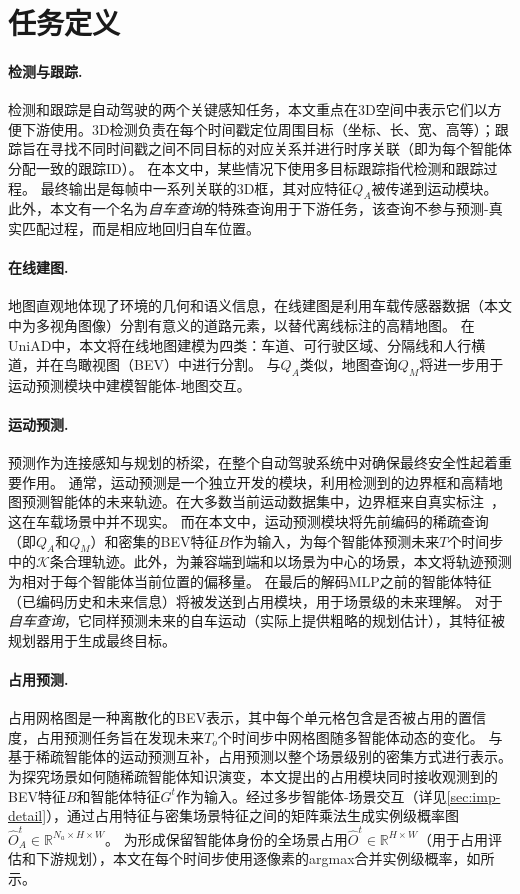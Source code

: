 \documentclass[10pt,twocolumn,letterpaper]{article}
\begin{document}
\section{任务定义}
\label{sec:task-def}

\paragraph{检测与跟踪.}
检测和跟踪是自动驾驶的两个关键感知任务，本文重点在3D空间中表示它们以方便下游使用。3D检测负责在每个时间戳定位周围目标（坐标、长、宽、高等）；跟踪旨在寻找不同时间戳之间不同目标的对应关系并进行时序关联（即为每个智能体分配一致的跟踪ID）。
%
在本文中，某些情况下使用多目标跟踪指代检测和跟踪过程。
%
最终输出是每帧中一系列关联的3D框，其对应特征$Q_A$被传递到运动模块。
%
此外，本文有一个名为\textit{自车查询}的特殊查询用于下游任务，该查询不参与预测-真实匹配过程，而是相应地回归自车位置。

\paragraph{在线建图.} 地图直观地体现了环境的几何和语义信息，在线建图是利用车载传感器数据（本文中为多视角图像）分割有意义的道路元素，以替代离线标注的高精地图。
%
在UniAD中，本文将在线地图建模为四类：车道、可行驶区域、分隔线和人行横道，并在鸟瞰视图（BEV）中进行分割。
%
与$Q_A$类似，地图查询$Q_M$将进一步用于运动预测模块中建模智能体-地图交互。



\paragraph{运动预测.} 预测作为连接感知与规划的桥梁，在整个自动驾驶系统中对确保最终安全性起着重要作用。
%
通常，运动预测是一个独立开发的模块，利用检测到的边界框和高精地图预测智能体的未来轨迹。在大多数当前运动数据集中，边界框来自真实标注~\cite{ettinger2021waymomotion}，这在车载场景中并不现实。
%
而在本文中，运动预测模块将先前编码的稀疏查询（即$Q_{A}$和$Q_{M}$）和密集的BEV特征$B$作为输入，为每个智能体预测未来$T$个时间步中的$\mathcal{K}$条合理轨迹。此外，为兼容端到端和以场景为中心的场景，本文将轨迹预测为相对于每个智能体当前位置的偏移量。
%
在最后的解码MLP之前的智能体特征（已编码历史和未来信息）将被发送到占用模块，用于场景级的未来理解。
%
对于\textit{自车查询}，它同样预测未来的自车运动（实际上提供粗略的规划估计），其特征被规划器用于生成最终目标。

\paragraph{占用预测.} 占用网格图是一种离散化的BEV表示，其中每个单元格包含是否被占用的置信度，占用预测任务旨在发现未来$T_o$个时间步中网格图随多智能体动态的变化。
%
与基于稀疏智能体的运动预测互补，占用预测以整个场景级别的密集方式进行表示。为探究场景如何随稀疏智能体知识演变，本文提出的占用模块同时接收观测到的BEV特征$B$和智能体特征$G^t$作为输入。经过多步智能体-场景交互（详见\cref{sec:imp-detail}），通过占用特征与密集场景特征之间的矩阵乘法生成实例级概率图$\hat{O}_A^t\!\in\!\mathbb{R}^{N_a\!\times\!H\!\times\!W}$。
%
为形成保留智能体身份的全场景占用$\hat{O}^t\!\in\!\mathbb{R}^{H\!\times\!W}$（用于占用评估和下游规划），本文在每个时间步使用逐像素的argmax合并实例级概率，如\cite{carion2020detr}所示。
\end{document}
